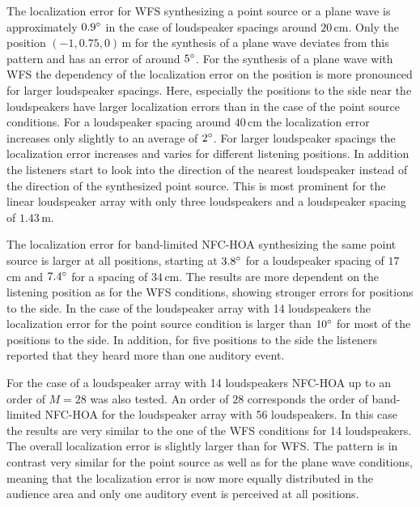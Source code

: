 The localization error for \ac{WFS} synthesizing a point source or a plane wave
is approximately $0.9^\circ$ in the case of loudspeaker spacings around
$20$\,cm. Only the position $(-1,0.75,0)$\,m for the synthesis of a plane wave
deviates from this pattern and has an error of around $5^\circ$. For the synthesis
of a plane wave with \ac{WFS} the dependency of the localization error on the
position is more pronounced for larger loudspeaker spacings. Here,
especially the positions to the side near the loudspeakers have larger
localization errors than in the case of the point source conditions. For a
loudspeaker spacing around $40$\,cm the localization error increases only slightly
to an average of $2^\circ$. For larger loudspeaker spacings the
localization error increases and varies for different listening
positions. In addition the listeners start to look into the direction of the
nearest loudspeaker instead of the direction of the synthesized point source.
This is most prominent for the linear loudspeaker array with only three
loudspeakers and a loudspeaker spacing of $1.43$\,m.

The localization error for band-limited \ac{NFC-HOA} synthesizing the same
point source is larger at all positions, starting at $3.8^\circ$ for a
loudspeaker spacing of $17$\,cm and $7.4^\circ$ for a spacing of $34$\,cm.
The results are more dependent on the listening position as for the \ac{WFS}
conditions, showing stronger errors for positions to the side.
In the case of the loudspeaker array with 14 loudspeakers the
localization error for the point source condition is larger than $10^\circ$ for
most of the positions to the side. In addition, for five positions to the side
the listeners reported that they heard more than one auditory event.

For the case of a loudspeaker array with 14 loudspeakers \ac{NFC-HOA}
up to an order of $M = 28$ was also tested. An order of $28$
corresponds the order of band-limited
\ac{NFC-HOA} for the loudspeaker array with 56 loudspeakers. 
In this case the results are very similar to the one of the \ac{WFS} conditions
for 14 loudspeakers. The overall localization error is slightly larger than for
\ac{WFS}. The pattern is in contrast very similar for the point source as well as for the
plane wave conditions, meaning that the localization error is now more equally
distributed in the audience area and only one auditory event is perceived at all
positions.

